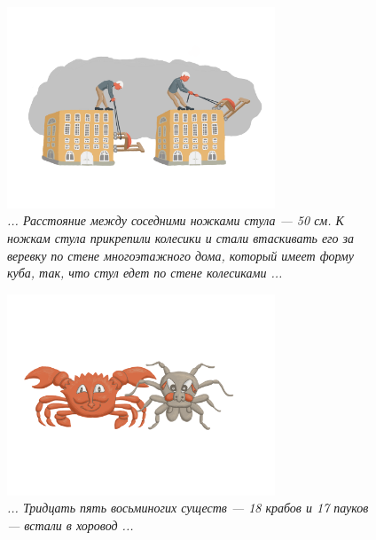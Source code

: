 \documentclass[10pt]{scrbook} \usepackage{modules/nonstahp_book}
\begin{document}
\begin{figure} \begin{center}
	\includegraphics[width=8cm]{figures/color/17}
	\caption{
             {\itshape ... Расстояние между соседними ножками стула — 50 см. 
             К ножкам стула прикрепили колесики и стали втаскивать его за 
             веревку по стене многоэтажного дома, который имеет форму куба, 
             так, что стул едет по стене колесиками ...}\\
             }
\end{center} \end{figure}

\begin{figure} \begin{center}
	\includegraphics[width=8cm]{figures/color/18}
	\caption{
             {\itshape ... Тридцать пять восьминогих существ — 18 крабов и 17 
            пауков — встали в хоровод ...}\\
             }
\end{center} \end{figure}
\end{document}
